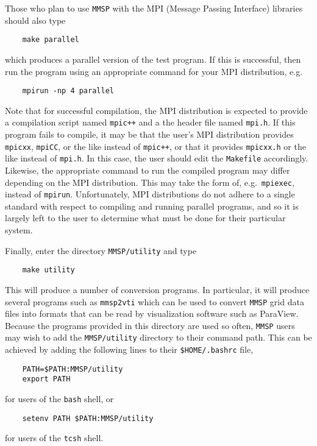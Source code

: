 Those who plan to use {\tt MMSP} with the MPI (Message Passing Interface) libraries should also type
\begin{shadebox}
\begin{verbatim}
    make parallel
\end{verbatim}
\end{shadebox}
which produces a parallel version of the test program.  If this is successful, then run the program using an appropriate command for your MPI distribution, e.g.\
\begin{shadebox}
\begin{verbatim}
    mpirun -np 4 parallel
\end{verbatim}
\end{shadebox}
Note that for successful compilation, the MPI distribution is expected to provide a compilation script named {\tt mpic++} and a the header file named {\tt mpi.h}.  If this program fails to compile, it may be that the user's MPI distribution provides {\tt mpicxx}, {\tt mpiCC}, or the like instead of {\tt mpic++}, or that it provides {\tt mpicxx.h} or the like instead of {\tt mpi.h}.  In this case, the user should edit the {\tt Makefile} accordingly.  Likewise, the appropriate command to run the compiled program may differ depending on the MPI distribution.  This may take the form of, e.g.\ {\tt mpiexec}, instead of {\tt mpirun}.  Unfortunately, MPI distributions do not adhere to a single standard with respect to compiling and running parallel programs, and so it is largely left to the user to determine what must be done for their particular system.

Finally, enter the directory {\tt MMSP/utility} and type
\begin{shadebox}
\begin{verbatim}
    make utility
\end{verbatim}
\end{shadebox}
This will produce a number of conversion programs.  In particular, it will produce several programs such as {\tt mmsp2vti} which can be used to convert {\tt MMSP} grid data files into formats that can be read by visualization software such as ParaView.  Because the programs provided in this directory are used so often, {\tt MMSP} users may wish to add the {\tt MMSP/utility} directory to their command path.  This can be achieved by adding the following lines to their {\tt \$HOME/.bashrc} file,
\begin{shadebox}
\begin{verbatim}
    PATH=$PATH:MMSP/utility
    export PATH
\end{verbatim}
\end{shadebox}
for users of the {\tt bash} shell, or
\begin{shadebox}
\begin{verbatim}
    setenv PATH $PATH:MMSP/utility
\end{verbatim}
\end{shadebox}
for users of the {\tt tcsh} shell.


